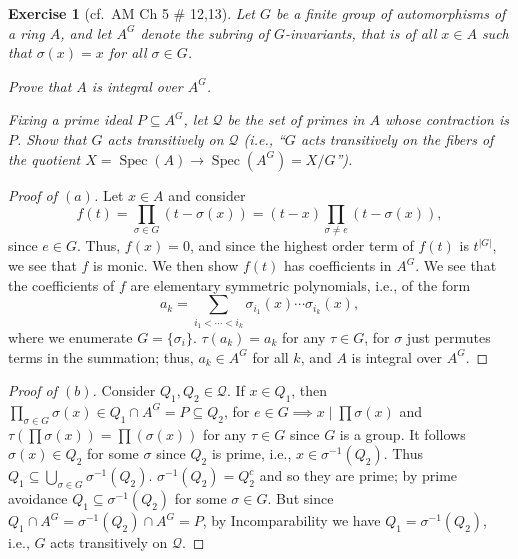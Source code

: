 \documentclass[12pt,letterpaper]{article}
\newtheorem{problem}{Exercise}[section]
\theoremstyle{definition}
\theoremstyle{remark}
\numberwithin{figure}{problem}
\numberwithin{equation}{section}
\DeclareMathOperator{\Spec}{Spec}
\begin{document}
\begin{problem}[cf.~AM Ch 5 \# 12,13]
  Let $G$ be a finite group of automorphisms of a ring $A$, and let $A^G$ denote the subring of $G$-invariants, that is of all $x \in A$ such that $\sigma(x) = x$ for all $\sigma \in G$.
  \begin{enum}
    \item Prove that $A$ is integral over $A^G$.
    \item Fixing a prime ideal $P \subseteq A^G$, let $\mathcal{Q}$ be the set of primes in $A$ whose contraction is $P$. Show that $G$ acts transitively on $\mathcal{Q}$ (i.e., ``$G$ acts transitively on the fibers of the quotient $X = \Spec(A) \to \Spec(A^G) = X/G$'').
  \end{enum}
\end{problem}
\begin{proof}[Proof of $(a)$]
  Let $x \in A$ and consider
  \begin{equation*}
    f(t) = \prod_{\sigma \in G} (t - \sigma(x)) = (t-x)\prod_{\sigma \ne e}(t-\sigma(x)),
  \end{equation*}
  since $e \in G$. Thus, $f(x) = 0$, and since the highest order term of $f(t)$ is $t^{|G|}$, we see that $f$ is monic. We then show $f(t)$ has coefficients in $A^G$. We see that the coefficients of $f$ are elementary symmetric polynomials, i.e., of the form
  \begin{equation*}
    a_k = \sum_{i_1 < \cdots < i_k} \sigma_{i_1}(x)\cdots\sigma_{i_k}(x),
  \end{equation*}
  where we enumerate $G=\{\sigma_i\}$. $\tau(a_k) = a_k$ for any $\tau\in G$, for $\sigma$ just permutes terms in the summation; thus, $a_k \in A^G$ for all $k$, and $A$ is integral over $A^G$.
\end{proof}
\begin{proof}[Proof of $(b)$]
  Consider $Q_1,Q_2 \in \mathcal{Q}$. If $x \in Q_1$, then $\prod_{\sigma \in G}\sigma(x) \in Q_1 \cap A^G = P \subseteq Q_2$, for $e \in G \implies x \mid \prod\sigma(x)$ and $\tau(\prod\sigma(x)) = \prod(\sigma(x))$ for any $\tau \in G$ since $G$ is a group. It follows $\sigma(x) \in Q_2$ for some $\sigma$ since $Q_2$ is prime, i.e., $x \in \sigma^{-1}(Q_2)$. Thus $Q_1 \subseteq \bigcup_{\sigma \in G}\sigma^{-1}(Q_2)$. $\sigma^{-1}(Q_2) = Q_2^c$ and so they are prime; by prime avoidance $Q_1 \subseteq \sigma^{-1}(Q_2)$ for some $\sigma \in G$. But since $Q_1 \cap A^G = \sigma^{-1}(Q_2) \cap A^G = P$, by Incomparability we have $Q_1 = \sigma^{-1}(Q_2)$, i.e., $G$ acts transitively on $\mathcal{Q}$.
\end{proof}
\end{document}
